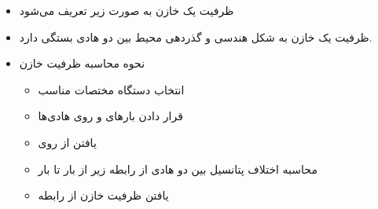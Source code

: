 \begin{ELjoin}

\begin{itemize}
\tightlist
\item
  ظرفیت یک خازن به صورت زیر تعریف می‌شود
\end{itemize}

\begin{ELdefinition}{}


\end{ELdefinition}

\end{ELjoin}

\begin{ELunit}

\begin{itemize}
\tightlist
\item
  ظرفیت یک خازن به شکل هندسی و گذردهی محیط بین دو هادی بستگی دارد.
\item
  نحوه محاسبه ظرفیت خازن

  \begin{itemize}
  \tightlist
  \item
    انتخاب دستگاه مختصات مناسب
  \item
    قرار دادن بارهای  و  روی هادی‌ها
  \item
    یافتن  از روی 
  \item
    محاسبه اختلاف پتانسیل بین دو هادی از رابطه زیر از بار  تا بار 
  \item
    یافتن ظرفیت خازن از رابطه 
  \end{itemize}
\end{itemize}

\end{ELunit}


